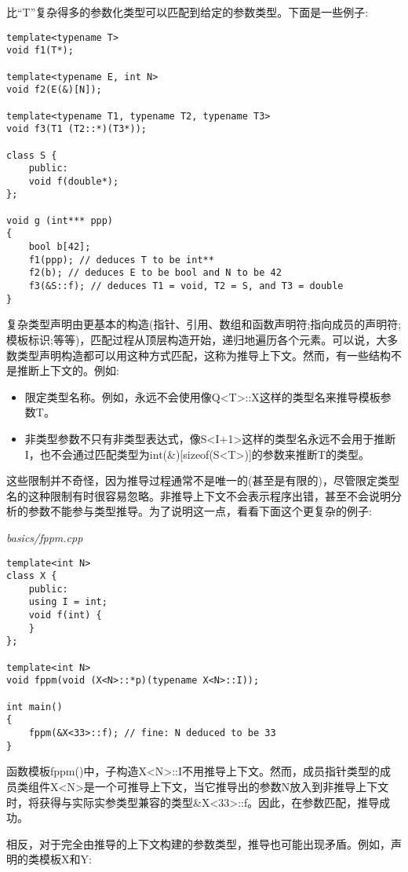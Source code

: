 比“T”复杂得多的参数化类型可以匹配到给定的参数类型。下面是一些例子:

\begin{lstlisting}[style=styleCXX]
template<typename T>
void f1(T*);

template<typename E, int N>
void f2(E(&)[N]);

template<typename T1, typename T2, typename T3>
void f3(T1 (T2::*)(T3*));

class S {
	public:
	void f(double*);
};

void g (int*** ppp)
{
	bool b[42];
	f1(ppp); // deduces T to be int**
	f2(b); // deduces E to be bool and N to be 42
	f3(&S::f); // deduces T1 = void, T2 = S, and T3 = double
}
\end{lstlisting} 

复杂类型声明由更基本的构造(指针、引用、数组和函数声明符;指向成员的声明符;模板标识;等等)，匹配过程从顶层构造开始，递归地遍历各个元素。可以说，大多数类型声明构造都可以用这种方式匹配，这称为推导上下文。然而，有一些结构不是推断上下文的。例如:

\begin{itemize}
\item 
限定类型名称。例如，永远不会使用像Q<T>::X这样的类型名来推导模板参数T。

\item 
非类型参数不只有非类型表达式，像S<I+1>这样的类型名永远不会用于推断I，也不会通过匹配类型为int(\&)[sizeof(S<T>)]的参数来推断T的类型。
\end{itemize}

这些限制并不奇怪，因为推导过程通常不是唯一的(甚至是有限的)，尽管限定类型名的这种限制有时很容易忽略。非推导上下文不会表示程序出错，甚至不会说明分析的参数不能参与类型推导。为了说明这一点，看看下面这个更复杂的例子:

\noindent
\textit{basics/fppm.cpp}
\begin{lstlisting}[style=styleCXX]
template<int N>
class X {
	public:
	using I = int;
	void f(int) {
	}
};

template<int N>
void fppm(void (X<N>::*p)(typename X<N>::I));

int main()
{
	fppm(&X<33>::f); // fine: N deduced to be 33
}
\end{lstlisting}

函数模板fppm()中，子构造X<N>::I不用推导上下文。然而，成员指针类型的成员类组件X<N>是一个可推导上下文，当它推导出的参数N放入到非推导上下文时，将获得与实际实参类型兼容的类型\&X<33>::f。因此，在参数匹配，推导成功。

相反，对于完全由推导的上下文构建的参数类型，推导也可能出现矛盾。例如，声明的类模板X和Y:

